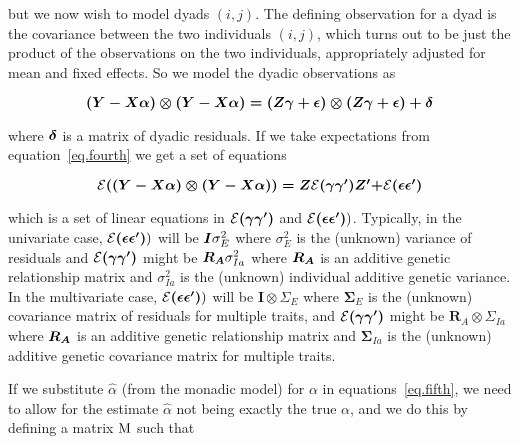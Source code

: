 \documentclass[titlepage]{article}  %
\begin{document}
but we now wish to model dyads $(i,j)$. The defining observation for a dyad is the covariance between the two individuals $(i,j)$, which turns out to be just the product of the observations on the two individuals, appropriately adjusted for mean and fixed effects. So we model the dyadic observations as 

\begin{equation}
\mbox{\boldmath $(Y - X \alpha)\otimes(Y - X \alpha) = (Z \gamma + \epsilon)\otimes(Z \gamma + \epsilon) + \delta$}    \label{eq.fourth}
\end{equation}

where $\mbox{\boldmath $\delta$}$ is a matrix of dyadic residuals. If we take expectations from equation~\ref{eq.fourth} we get a set of equations

\begin{equation}
{\cal E}\mbox{\boldmath $((Y - X \alpha)\otimes(Y - X \alpha)) = Z$}{\cal E}\mbox{\boldmath $(\gamma \gamma^{\prime})Z^{\prime} + $} {\cal E}\mbox{\boldmath $(\epsilon \epsilon^{\prime})$}        \label{eq.fifth}
\end{equation}

which is a set of linear equations in ${\cal E}\mbox{\boldmath $(\gamma \gamma^{\prime})$}$ and ${\cal E}\mbox{\boldmath $(\epsilon \epsilon^{\prime})$})$. Typically, in the univariate case,  ${\cal E}\mbox{\boldmath $(\epsilon \epsilon^{\prime})$})$ will be $\mbox{\boldmath $I$} \sigma^{2}_{E}$ where $\sigma^{2}_{E}$ is the (unknown) variance of residuals and ${\cal E}\mbox{\boldmath $(\gamma \gamma^{\prime})$}$ might be $\mbox{\boldmath $R_{A}$} \sigma^{2}_{Ia}$ where $\mbox{\boldmath $R_{A}$}$ is an additive genetic relationship matrix and $\sigma^{2}_{Ia}$ is the (unknown) individual additive genetic variance. In the multivariate case, ${\cal E}\mbox{\boldmath $(\epsilon \epsilon^{\prime})$})$ will be ${\bm I \otimes \Sigma_{E}}$ where ${\bm \Sigma_{E}}$ is the (unknown) covariance matrix of residuals for multiple traits, and ${\cal E}\mbox{\boldmath $(\gamma \gamma^{\prime})$}$ might be ${\bm R_{A} \otimes \Sigma_{Ia}}$ where $\mbox{\boldmath $R_{A}$}$ is an additive genetic relationship matrix and ${\bm \Sigma_{Ia}}$ is the (unknown) additive genetic covariance matrix for multiple traits.

If we substitute $\hat{\alpha}$ (from the monadic model) for $\alpha$ in equations~\ref{eq.fifth}, we need to allow for the estimate $\hat{\alpha}$ not being exactly the true $\alpha$, and we do this by defining a matrix $\mbox{\boldmath M}$ such that 
\end{document}
